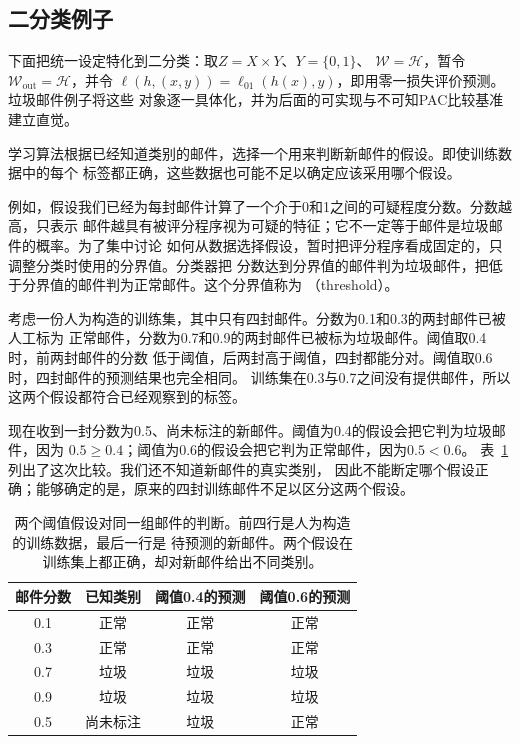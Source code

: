 \subsection{二分类例子}

下面把统一设定特化到二分类：取$Z=X\times Y$、$Y=\{0,1\}$、
$\mathcal W=\mathcal H$，暂令$\mathcal W_{\mathrm{out}}=\mathcal H$，并令
$\ell(h,(x,y))=\ell_{01}(h(x),y)$，即用零一损失评价预测。垃圾邮件例子将这些
对象逐一具体化，并为后面的可实现与不可知PAC比较基准建立直觉。

学习算法根据已经知道类别的邮件，选择一个用来判断新邮件的假设。即使训练数据中的每个
标签都正确，这些数据也可能不足以确定应该采用哪个假设。

例如，假设我们已经为每封邮件计算了一个介于0和1之间的可疑程度分数。分数越高，只表示
邮件越具有被评分程序视为可疑的特征；它不一定等于邮件是垃圾邮件的概率。为了集中讨论
如何从数据选择假设，暂时把评分程序看成固定的，只调整分类时使用的分界值。分类器把
分数达到分界值的邮件判为垃圾邮件，把低于分界值的邮件判为正常邮件。这个分界值称为
（threshold）。

考虑一份人为构造的训练集，其中只有四封邮件。分数为0.1和0.3的两封邮件已被人工标为
正常邮件，分数为0.7和0.9的两封邮件已被标为垃圾邮件。阈值取0.4时，前两封邮件的分数
低于阈值，后两封高于阈值，四封都能分对。阈值取0.6时，四封邮件的预测结果也完全相同。
训练集在0.3与0.7之间没有提供邮件，所以这两个假设都符合已经观察到的标签。

现在收到一封分数为0.5、尚未标注的新邮件。阈值为0.4的假设会把它判为垃圾邮件，因为
$0.5\geq0.4$；阈值为0.6的假设会把它判为正常邮件，因为$0.5<0.6$。
表~\ref{tab:threshold-email-decisions}列出了这次比较。我们还不知道新邮件的真实类别，
因此不能断定哪个假设正确；能够确定的是，原来的四封训练邮件不足以区分这两个假设。

\begin{table}[htbp]
 \centering
 \begin{tabular}{cccc}
  \toprule
  邮件分数 & 已知类别 & 阈值0.4的预测 & 阈值0.6的预测\\
  \midrule
  0.1 & 正常 & 正常 & 正常\\
  0.3 & 正常 & 正常 & 正常\\
  0.7 & 垃圾 & 垃圾 & 垃圾\\
  0.9 & 垃圾 & 垃圾 & 垃圾\\
  \midrule
  0.5 & 尚未标注 & 垃圾 & 正常\\
  \bottomrule
 \end{tabular}
 \caption{两个阈值假设对同一组邮件的判断。前四行是人为构造的训练数据，最后一行是
 待预测的新邮件。两个假设在训练集上都正确，却对新邮件给出不同类别。}
 \label{tab:threshold-email-decisions}
\end{table}

